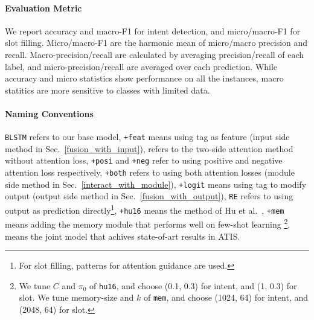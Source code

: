 \paragraph{Evaluation Metric}
We report accuracy and macro-F1 for intent detection, and micro/macro-F1 for slot filling.
Micro/macro-F1 are the harmonic mean of micro/macro precision and recall.
Macro-precision/recall are calculated by averaging precision/recall of each label, and micro-precision/recall are averaged over each prediction. 
While accuracy and micro statistics show performance on all the instances, macro statitics are more sensitive to classes with limited data.

\paragraph{Naming Conventions}
\texttt{BLSTM} refers to our base model,
\texttt{+feat} means using \RE tag as feature (input side method in Sec.~\ref{fusion_with_input}),
\ptatt refers to the two-side attention method without attention loss,
\texttt{+posi} and \texttt{+neg} refer to using positive and negative attention loss respectively, \texttt{+both} refers to using both attention losses (\NN module side method in Sec.~\ref{interact_with_module}),
\texttt{+logit} means using \RE tag to modify \NN output (output side method in Sec.~\ref{fusion_with_output}),
\texttt{RE} refers to using \RE output as prediction directly\footnote{
For slot filling, patterns for attention guidance are used.}, 
\texttt{+hu16} means the method of Hu et al.~,
\texttt{+mem} means adding the memory module that performs well on few-shot learning \cite{kaiser2017learning}\footnote{
We tune $C$ and $\pi_0$ of \texttt{hu16}, and choose (0.1, 0.3) for intent, and (1, 0.3) for slot. We tune memory-size and $k$ of \texttt{mem}, and choose (1024, 64) for intent, and (2048, 64) for slot.
}, 
\LL means the joint model \cite{liu2016attention} that achives state-of-art results in ATIS. 




